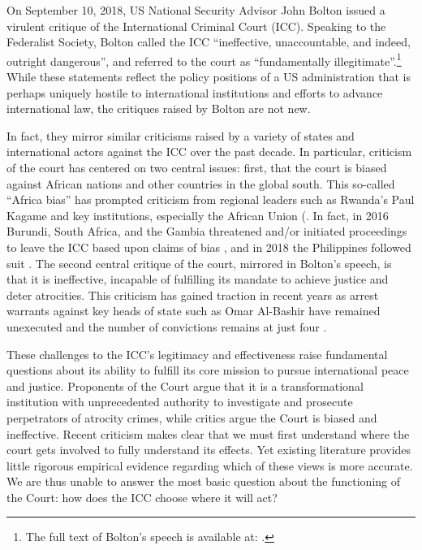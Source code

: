 On September 10, 2018, US National Security Advisor John Bolton issued a virulent critique of the International Criminal Court (ICC). Speaking to the Federalist Society, Bolton called the ICC ``ineffective, unaccountable, and indeed, outright dangerous'', and referred to the court as ``fundamentally illegitimate''.\footnote{The full text of Bolton's speech is available at: \citep{bolton_speech}.} While these statements reflect the policy positions of a US administration that is perhaps uniquely hostile to international institutions and efforts to advance international law, the critiques raised by Bolton are not new.

In fact, they mirror similar criticisms raised by a variety of states and international actors against the ICC over the past decade. In particular, criticism of the court has centered on two central issues: first, that the court is biased against African nations and other countries in the global south. This so-called ``Africa bias'' has prompted criticism from regional leaders such as Rwanda's Paul Kagame and key institutions, especially the African Union (\citep{bbc_news_2012, murithi2012international}. In fact, in 2016 Burundi, South Africa, and the Gambia threatened and/or initiated proceedings to leave the ICC based upon claims of bias \citep{murphy_2016}, and in 2018 the Philippines followed suit \citep{villamor2018philippines}. The second central critique of the court, mirrored in Bolton's speech, is that it is ineffective, incapable of fulfilling its mandate to achieve justice and deter atrocities. This criticism has gained traction in recent years as arrest warrants against key heads of state such as Omar Al-Bashir have remained unexecuted and the number of convictions remains at just four \citep{wang_2018, White_2018}.

These challenges to the ICC's legitimacy and effectiveness raise fundamental questions about its ability to fulfill its core mission to pursue international peace and justice. Proponents of the Court argue that it is a transformational institution with unprecedented authority to investigate and prosecute perpetrators of atrocity crimes, while critics argue the Court is biased and ineffective. Recent criticism makes clear that we must first understand where the court gets involved to fully understand its effects. Yet existing literature provides little rigorous empirical evidence regarding which of these views is more accurate. We are thus unable to answer the most basic question about the functioning of the Court: how does the ICC choose where it will act?

